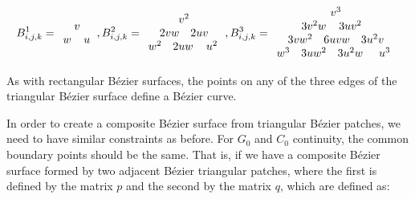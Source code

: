 \begin{equation}
B^1_{i,j,k} = \begin{array}{cccc}
& \multicolumn{2}{c}{v} & \\
\multicolumn{2}{c}{w} & \multicolumn{2}{c}{u}
\end{array},
B^2_{i,j,k} = \begin{array}{cccccc}
\multicolumn{6}{c}{v^2} \\
& \multicolumn{2}{c}{2vw} & \multicolumn{2}{c}{2uv} & \\
\multicolumn{2}{c}{w^2} & \multicolumn{2}{c}{2uw} & \multicolumn{2}{c}{u^2}
\end{array},
B^3_{i,j,k} = \begin{array}{cccccccc}
\multicolumn{8}{c}{v^3} \\
&& \multicolumn{2}{c}{3v^2w} & \multicolumn{2}{c}{3uv^2} && \\
& \multicolumn{2}{c}{3vw^2} & \multicolumn{2}{c}{6uvw} & \multicolumn{2}{c}{3u^2v} & \\
\multicolumn{2}{c}{w^3} & \multicolumn{2}{c}{3uw^2} & \multicolumn{2}{c}{3u^2w} & \multicolumn{2}{c}{u^3}
\end{array}
\end{equation}

As with rectangular B\'ezier surfaces, the points on any of the three edges of the triangular B\'ezier surface define a B\'ezier curve.

In order to create a composite B\'ezier surface from triangular B\'ezier patches, we need to have similar constraints as before.
For \(G_0\) and \(C_0\) continuity, the common boundary points should be the same.
That is, if we have a composite B\'ezier surface formed by two adjacent B\'ezier triangular patches, where the first is defined by the matrix \(p\) and the second by the matrix \(q\), which are defined as:

